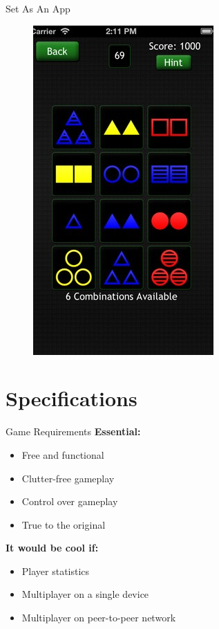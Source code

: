 \documentclass{beamer}
\begin{document}
\begin{frame}[t]{Set As An App}
\begin{figure}[H!]
 \includegraphics[height=.25\paperwidth]{img/combinations.jpg}
\end{figure}

\end{frame}

\section{Specifications}
\begin{frame}[t]{Game Requirements}
\textbf{Essential:}
\begin{itemize}
 \item Free and functional
 \item Clutter-free gameplay
 \item Control over gameplay
 \item True to the original
\end{itemize}
\pause
\vspace{.5cm}
\textbf{It would be cool if:}
\begin{itemize}
 \item Player statistics
 \item Multiplayer on a single device
 \item Multiplayer on peer-to-peer network
\end{itemize}
\end{frame}
\end{document}
